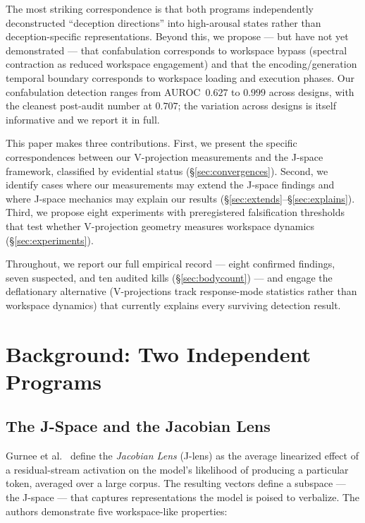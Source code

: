 \documentclass[11pt,a4paper]{article}
\begin{document}
The most striking correspondence is that both programs independently
deconstructed ``deception directions'' into high-arousal states rather
than deception-specific representations. Beyond this, we propose ---
but have not yet demonstrated --- that confabulation corresponds to
workspace bypass (spectral contraction as reduced workspace engagement)
and that the encoding/generation temporal boundary corresponds to
workspace loading and execution phases. Our confabulation detection
ranges from AUROC~$0.627$ to $0.999$ across designs, with the cleanest
post-audit number at $0.707$; the variation across designs is itself
informative and we report it in full.

This paper makes three contributions. First, we present the specific
correspondences between our V-projection measurements and the J-space
framework, classified by evidential status
(\S\ref{sec:convergences}). Second, we identify cases where our
measurements may extend the J-space findings and where J-space mechanics
may explain our results
(\S\ref{sec:extends}--\S\ref{sec:explains}). Third, we propose eight
experiments with preregistered falsification thresholds that test
whether V-projection geometry measures workspace dynamics
(\S\ref{sec:experiments}).

Throughout, we report our full empirical record --- eight confirmed
findings, seven suspected, and ten audited kills
(\S\ref{sec:bodycount}) --- and engage
the deflationary alternative (V-projections track response-mode
statistics rather than workspace dynamics) that currently explains every
surviving detection result.

\section{Background: Two Independent Programs}
\label{sec:background}

\subsection{The J-Space and the Jacobian Lens}

Gurnee et al.~\citep{gurnee2026gwt} define the \emph{Jacobian Lens}
(J-lens) as the average linearized effect of a residual-stream activation
on the model's likelihood of producing a particular token, averaged over
a large corpus. The resulting vectors define a subspace --- the J-space ---
that captures representations the model is poised to verbalize. The
authors demonstrate five workspace-like properties:
\end{document}
